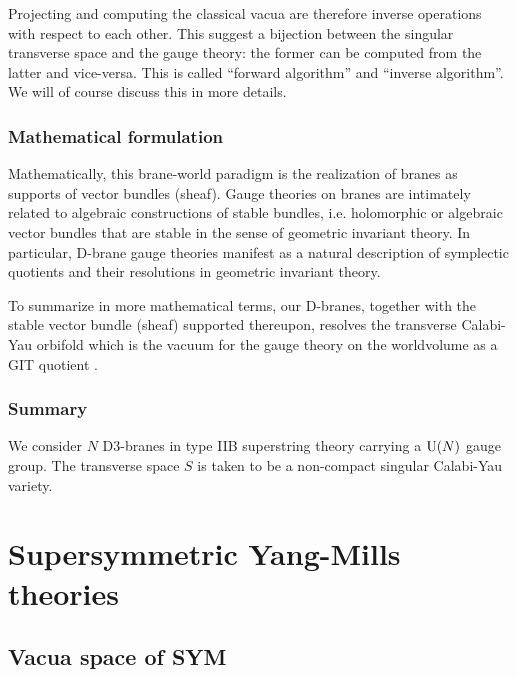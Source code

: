         Projecting and computing the classical vacua are therefore inverse operations with respect to each other. This suggest a bijection between the singular transverse space and the gauge theory: the former can be computed from the latter and vice-versa. This is called ``forward algorithm'' and ``inverse algorithm''. We will of course discuss this in more details.

    \subsubsection*{Mathematical formulation}

        Mathematically, this brane-world paradigm is the realization of branes as supports of vector bundles (sheaf). Gauge theories on branes are intimately related to algebraic constructions of stable bundles, i.e. holomorphic or algebraic vector bundles that are stable in the sense of geometric invariant theory. In particular, D-brane gauge theories manifest as a natural description of symplectic quotients and their resolutions in geometric invariant theory.

        To summarize in more mathematical terms, our D-branes, together with the stable vector bundle (sheaf) supported thereupon, resolves the transverse Calabi-Yau orbifold which is the vacuum for the gauge theory on the worldvolume as a GIT quotient \marker.

    \subsubsection*{Summary}

        We consider $N$ D$3$-branes in type IIB superstring theory carrying a $\text{U}(N)$ gauge group. The transverse space $S$ is taken to be a non-compact singular Calabi-Yau variety.

\section{Supersymmetric Yang-Mills theories}

    \subsection{Vacua space of SYM}


